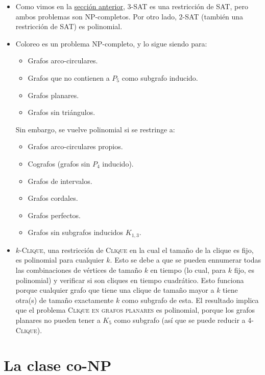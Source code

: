 \begin{itemize}
    \item Como vimos en la \hyperref[3-sat]{sección anterior}, 3-SAT es una restricción de SAT, pero ambos problemas son NP-completos. Por otro lado, 2-SAT (también una restricción de SAT) es polinomial.
    \item Coloreo es un problema NP-completo, y lo sigue siendo para:
          \begin{itemize}
              \item Grafos arco-circulares.
              \item Grafos que no contienen a $P_5$ como subgrafo inducido.
              \item Grafos planares.
              \item Grafos sin triángulos.
          \end{itemize}

          Sin embargo, se vuelve polinomial si se restringe a:
          \begin{itemize}
              \item Grafos arco-circulares propios.
              \item Cografos (grafos sin $P_4$ inducido).
              \item Grafos de intervalos.
              \item Grafos cordales.
              \item Grafos perfectos.
              \item Grafos sin subgrafos inducidos $K_{1, 3}$.
          \end{itemize}

    \item $k$-\textsc{Clique}, una restricción de \textsc{Clique} en la cual el tamaño de la clique es fijo, es polinomial para cualquier $k$. Esto se debe a que se pueden ennumerar todas las combinaciones de vértices de tamaño $k$ en tiempo  (lo cual, para $k$ fijo, es polinomial) y verificar si son cliques en tiempo cuadrático. Esto funciona porque cualquier grafo que tiene una clique de tamaño mayor a $k$ tiene otra(s) de tamaño exactamente $k$ como subgrafo de esta. El resultado implica que el problema \textsc{Clique en grafos planares} es polinomial, porque los grafos planares no pueden tener a $K_5$ como subgrafo (así que se puede reducir a \textsc{4-Clique}).
\end{itemize}

\section{La clase co-NP}

